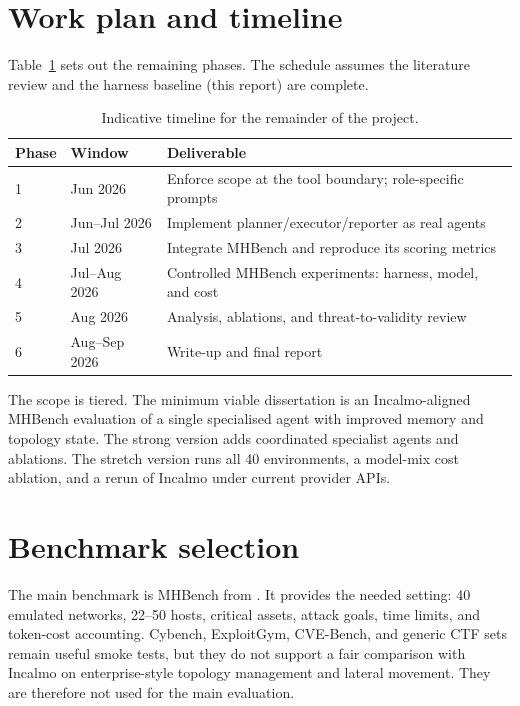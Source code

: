 \documentclass[12pt,oneside]{report}
\begin{document}
\section{Work plan and timeline}
Table~\ref{tab:timeline} sets out the remaining phases. The schedule assumes the
literature review and the harness baseline (this report) are complete.

\begin{table}[!htbp]
    \centering
    \caption{Indicative timeline for the remainder of the project.}
    \label{tab:timeline}
    \begin{tabularx}{\linewidth}{l l X}
        \hline
        \textbf{Phase} & \textbf{Window} & \textbf{Deliverable}                                      \\
        \hline
        1              & Jun 2026        & Enforce scope at the tool boundary; role-specific prompts \\
        2              & Jun--Jul 2026   & Implement planner/executor/reporter as real agents        \\
        3              & Jul 2026        & Integrate MHBench and reproduce its scoring metrics       \\
        4              & Jul--Aug 2026   & Controlled MHBench experiments: harness, model, and cost  \\
        5              & Aug 2026        & Analysis, ablations, and threat-to-validity review        \\
        6              & Aug--Sep 2026   & Write-up and final report                                 \\
        \hline
    \end{tabularx}
\end{table}

The scope is tiered. The minimum viable dissertation is an Incalmo-aligned
MHBench evaluation of a single specialised agent with improved memory and
topology state. The strong version adds coordinated specialist agents and
ablations. The stretch version runs all 40 environments, a model-mix cost
ablation, and a rerun of Incalmo under current provider APIs.

\section{Benchmark selection}
The main benchmark is MHBench from \citet{singer2025incalmo}. It provides the
needed setting: 40 emulated networks, 22--50 hosts, critical assets, attack
goals, time limits, and token-cost accounting. Cybench, ExploitGym, CVE-Bench,
and generic CTF sets remain useful smoke tests, but they do not support a fair
comparison with Incalmo on enterprise-style topology management and lateral
movement. They are therefore not used for the main evaluation.
\end{document}
